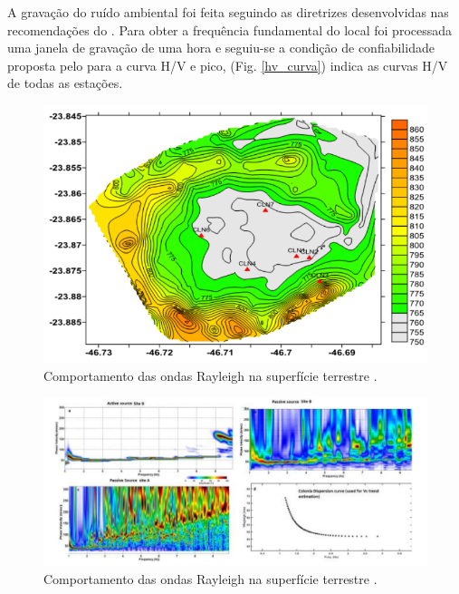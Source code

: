 \documentclass[smallextended]{svjour3}       %
\begin{document}
A gravação do ruído ambiental foi feita seguindo as diretrizes desenvolvidas nas recomendações do \cite{acerra2004guidelines}. Para obter a frequência fundamental do local foi processada uma janela de gravação de uma hora e seguiu-se a condição de confiabilidade proposta pelo \cite{acerra2004guidelines} para a curva H/V e pico, (Fig. \ref{hv_curva}) indica as curvas H/V de todas as estações.

\begin{figure}[!hbtp]
  \begin{center}
  
  \includegraphics[scale=0.5]{Figures/fig3.png}
  \end{center}
  \caption{Comportamento das ondas Rayleigh na superfície terrestre \citep{de2009filtragem}.}
  \label{stations}
\end{figure}
\newpage

\begin{figure}[!hbtp]
  \begin{center}
  
  \includegraphics[scale=0.5]{Figures/fig4.png}
  \end{center}
  \caption{Comportamento das ondas Rayleigh na superfície terrestre \citep{de2009filtragem}.}
  \label{curva_disp}
\end{figure}
\newpage
\end{document}
